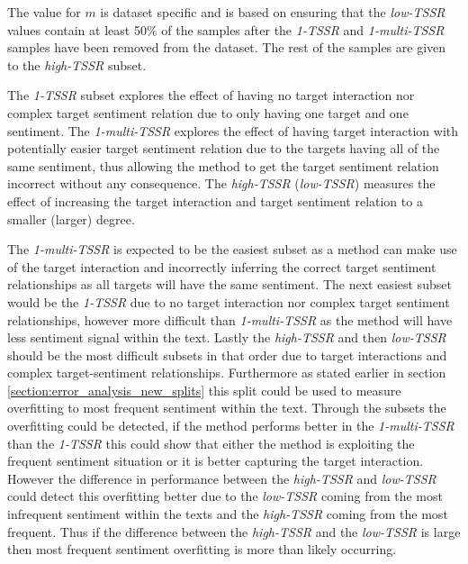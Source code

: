 The value for $m$ is dataset specific and is based on ensuring that the \textit{low-TSSR} values contain at least 50\% of the samples after the \textit{1-TSSR} and \textit{1-multi-TSSR} samples have been removed from the dataset. The rest of the samples are given to the \textit{high-TSSR} subset. 

The \textit{1-TSSR} subset explores the effect of having no target interaction nor complex target sentiment relation due to only having one target and one sentiment. The \textit{1-multi-TSSR} explores the effect of having target interaction with potentially easier target sentiment relation due to the targets having all of the same sentiment, thus allowing the method to get the target sentiment relation incorrect without any consequence. The \textit{high-TSSR} (\textit{low-TSSR}) measures the effect of increasing the target interaction and target sentiment relation to a smaller (larger) degree. 

The \textit{1-multi-TSSR} is expected to be the easiest subset as a method can make use of the target interaction and incorrectly inferring the correct target sentiment relationships as all targets will have the same sentiment. The next easiest subset would be the \textit{1-TSSR} due to no target interaction nor complex target sentiment relationships, however more difficult than \textit{1-multi-TSSR} as the method will have less sentiment signal within the text. Lastly the \textit{high-TSSR} and then \textit{low-TSSR} should be the most difficult subsets in that order due to target interactions and complex target-sentiment relationships. Furthermore as stated earlier in section \ref{section:error_analysis_new_splits} this split could be used to measure overfitting to most frequent sentiment within the text. Through the subsets the overfitting could be detected, if the method performs better in the \textit{1-multi-TSSR} than the \textit{1-TSSR} this could show that either the method is exploiting the frequent sentiment situation or it is better capturing the target interaction. However the difference in performance between the \textit{high-TSSR} and \textit{low-TSSR} could detect this overfitting better due to the \textit{low-TSSR} coming from the most infrequent sentiment within the texts and the \textit{high-TSSR} coming from the most frequent. Thus if the difference between the \textit{high-TSSR} and the \textit{low-TSSR} is large then most frequent sentiment overfitting is more than likely occurring.

